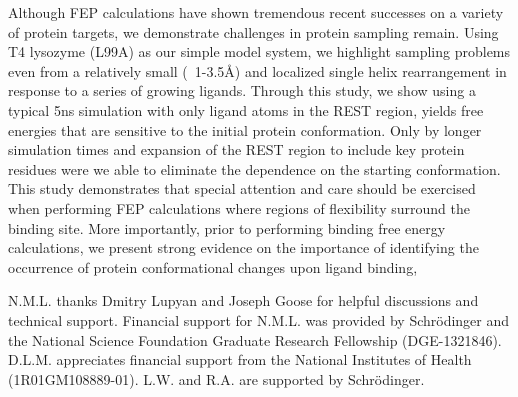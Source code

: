 \documentclass[journal=jctcce,manuscript=article]{achemso}
\begin{document}

Although FEP calculations have shown tremendous recent successes on a variety of protein targets\cite{FEPplus}, we demonstrate challenges in protein sampling remain. 
Using T4 lysozyme (L99A) as our simple model system, we highlight sampling problems even from a relatively small (~1-3.5\AA) and localized single helix rearrangement in response to a series of growing ligands.
Through this study, we show using a typical 5ns simulation with only ligand atoms in the REST region, yields free energies that are sensitive to the initial protein conformation. 
Only by longer simulation times and expansion of the REST region to include key protein residues were we able to eliminate the dependence on the starting conformation.
This study demonstrates that special attention and care should be exercised when performing FEP calculations where regions of flexibility surround the binding site.
More importantly, prior to performing binding free energy calculations, we present strong evidence on the importance of identifying the occurrence of protein conformational changes upon ligand binding, 

\begin{acknowledgement}
   N.M.L. thanks Dmitry Lupyan and Joseph Goose for helpful discussions and technical support. Financial support for N.M.L. was provided by Schr\"{o}dinger and the National Science Foundation Graduate Research Fellowship (DGE-1321846). D.L.M. appreciates financial support from the National Institutes of Health (1R01GM108889-01). L.W. and R.A. are supported by Schr\"{o}dinger.
\end{acknowledgement}
\end{document}
